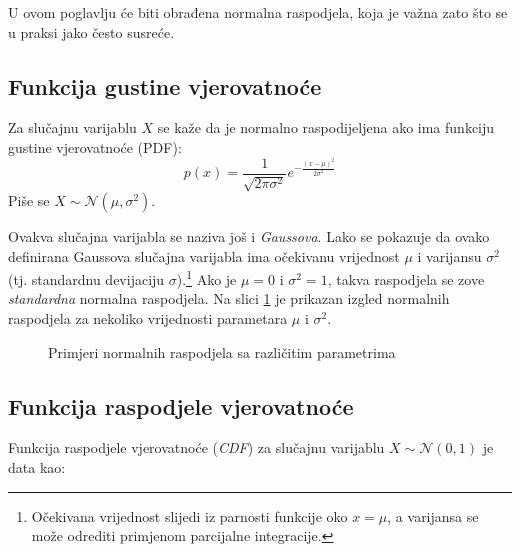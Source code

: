 \newcommand*{\vecrow}[2]{\left[\begin{array}{cc}#1&#2\end{array}\right]}
\newcommand*{\veccol}[2]{\left[\begin{array}{c}#1\\#2\end{array}\right]}

U ovom poglavlju će biti obrađena normalna raspodjela, koja je važna zato što se
u praksi jako često susreće.

\subsection{Funkcija gustine vjerovatnoće}

\begin{definition}
  Za slučajnu varijablu $X$ se kaže da je normalno raspodijeljena ako ima
  funkciju gustine vjerovatnoće (PDF):
  \begin{equation} \label{eq:normal}
    p(x) = \frac{1}{\sqrt{2\pi\sigma^2}} e^{-\frac{(x-\mu)^2}{2\sigma^2}}
  \end{equation}
  Piše se $X \sim \mathcal{N}(\mu,\sigma^2)$.
\end{definition}

Ovakva slučajna varijabla se naziva još i \textit{Gaussova}. Lako se pokazuje da
ovako definirana Gaussova slučajna varijabla ima očekivanu vrijednost $\mu$ i
varijansu $\sigma^2$ (tj. standardnu devijaciju $\sigma$).\footnote{Očekivana
  vrijednost slijedi iz parnosti funkcije oko $x=\mu$, a varijansa se može
odrediti primjenom parcijalne integracije.} Ako je $\mu=0$ i $\sigma^2=1$, takva
raspodjela se zove \textit{standardna} normalna raspodjela. Na slici
\ref{fig:gauss-uni} je prikazan izgled normalnih raspodjela za nekoliko
vrijednosti parametara $\mu$ i $\sigma^2$.

\begin{figure}[h]
  \centering
	\caption{Primjeri normalnih raspodjela sa različitim parametrima}
  \label{fig:gauss-uni}
\end{figure}

\subsection{Funkcija raspodjele vjerovatnoće}

Funkcija raspodjele vjerovatnoće (\textit{CDF}) za slučajnu varijablu $X \sim
\mathcal{N}(0, 1)$ je data kao:

